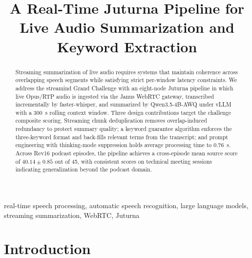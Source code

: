 \documentclass[conference,letterpaper]{IEEEtran}
\begin{document}
\title{A Real-Time Juturna Pipeline for Live Audio Summarization and Keyword Extraction}

\author{
    \and
    \and
}

\maketitle


\begin{abstract}
    Streaming summarization of live audio requires systems that maintain coherence across overlapping speech segments while satisfying strict per-window latency constraints.
    We address the \gls{streamind} Grand Challenge with an eight-node Juturna pipeline in which live Opus/RTP audio is ingested via the Janus WebRTC gateway, transcribed incrementally by faster-whisper, and summarized by Qwen3.5-4B-AWQ under vLLM with a \SI{300}{\second} rolling context window.
    Three design contributions target the challenge composite scoring.
    Streaming chunk deduplication removes overlap-induced redundancy to protect summary quality; a keyword guarantee algorithm enforces the three-keyword format and back-fills relevant terms from the transcript; and prompt engineering with thinking-mode suppression holds average processing time to \SI{0.76}{\second}.
    Across Rev16 podcast episodes, the pipeline achieves a cross-episode mean source score of $40.14 \pm 0.85$ out of \num{45}, with consistent scores on technical meeting sessions indicating generalization beyond the podcast domain.
\end{abstract}

\begin{IEEEkeywords}
    real-time speech processing, automatic speech recognition, large language models, streaming summarization, WebRTC, Juturna
\end{IEEEkeywords}

\section{Introduction}
\label{sec:introduction}
\end{document}
